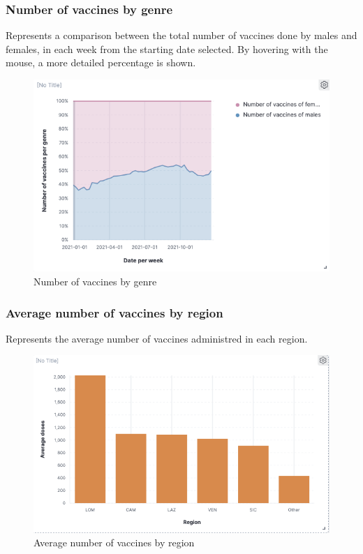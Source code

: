 \documentclass[12pt, a4paper]{article}
\begin{document}
\subsubsection{Number of vaccines by genre}
Represents a comparison between the total number of vaccines done by males and females,
in each week from the starting date selected. By hovering with the mouse, a more 
detailed percentage is shown.
\begin{figure}[ht]
  \centering
  \includegraphics[width=.8\linewidth]{img (9).png}
\caption*{Number of vaccines by genre}
\end{figure}

\subsubsection{Average number of vaccines by region}
Represents the average number of vaccines administred in each region.
\begin{figure}[ht]
  \centering
  \includegraphics[width=.8\linewidth]{img (10).png}
\caption*{Average number of vaccines by region}
\end{figure}
\end{document}
